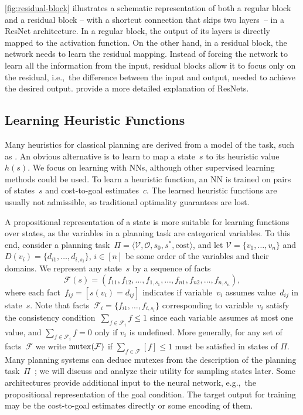 \cref{fig:residual-block} illustrates a schematic representation of both a regular block and a residual block -- with a shortcut connection that skips two layers~-- in a ResNet architecture. In a regular block, the output of its layers is directly mapped to the activation function. On the other hand, in a residual block, the network needs to learn the residual mapping. Instead of forcing the network to learn all the information from the input, residual blocks allow it to focus only on the residual, i.e.,~the difference between the input and output, needed to achieve the desired output. \citet{he2016deep} provide a more detailed explanation of ResNets.

\subsection{Learning Heuristic Functions}
\label{sec:learning-heuristics}

Many heuristics for classical planning are derived from a model of the task, such as \sas. An obvious alternative is to learn to map a state~$s$ to its heuristic value~$h(s)$. We focus on learning with NNs, although other supervised learning methods could be used. To learn a heuristic function, an NN is trained on pairs of states~$s$ and cost-to-goal estimates~$c$. The learned heuristic functions are usually not admissible, so traditional optimality guarantees are lost.

A propositional representation of a state is more suitable for learning functions over states, as the variables in a planning task are categorical variables. To this end, consider a planning task~$\Pi=\langle\mathcal{V},\mathcal{O},s_0,s^*, \text{cost}\rangle$, and let $\mathcal{V}=\{v_1,\ldots,v_n\}$ and $D(v_i)=\{d_{i1},\ldots,d_{i,s_i}\}$, $i\in[n]$ be some order of the variables and their domains. We represent any state~$s$ by a sequence of facts $$\mathcal{F}(s)=(f_{11},f_{12},\ldots,f_{1,s_1},\ldots,f_{n1},f_{n2},\ldots,f_{n,s_n}),$$ where each fact~$f_{ij}=[s(v_i)=d_{ij}]$ indicates if variable~$v_i$ assumes value~$d_{ij}$ in state~$s$. Note that facts~$\mathcal{F}_i=\{f_{i1},\ldots,f_{i,s_i}\}$ corresponding to variable~$v_i$ satisfy the consistency condition~$\sum_{f\in \mathcal{F}_i} f\leq 1$ since each variable assumes at most one value, and $\sum_{f\in \mathcal{F}_i} f=0$ only if $v_i$ is undefined. More generally, for any set of facts~$\mathcal{F}$ we write $\operatorname{mutex}(\mathcal{F})$ if $\sum_{f\in \mathcal{F}} [f]\leq 1$ must be satisfied in states of $\Pi$. Many planning systems can deduce mutexes from the description of the planning task~$\Pi$~\cite{helmert2009concise}; we will discuss and analyze their utility for sampling states later. Some architectures provide additional input to the neural network, e.g.,~the propositional representation of the goal condition. The target output for training may be the cost-to-goal estimates directly or some encoding of them.

